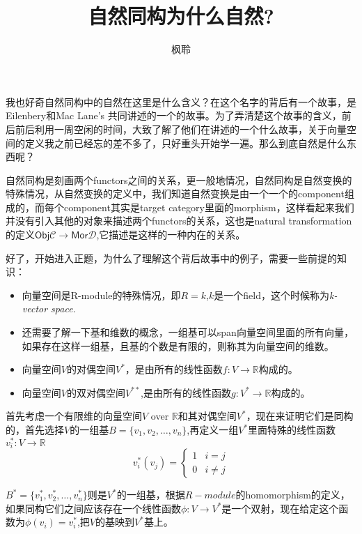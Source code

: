 \documentclass[UTF8,11pt,a4paper]{ctexart}%
\begin{document}
\newcommand*{\xfunc}[4]{{#2}\colon{#3}{#1}{#4}}
\newcommand*{\func}[3]{\xfunc{\to}{#1}{#2}{#3}}
 
\title{自然同构为什么自然?}
\author{枫聆}
\maketitle

我也好奇自然同构中的自然在这里是什么含义？在这个名字的背后有一个故事，是Eilenbery和Mac Lane's 共同讲述的一个的故事。为了弄清楚这个故事的含义，前后前后利用一周空闲的时间，大致了解了他们在讲述的一个什么故事，关于向量空间的定义我之前已经忘的差不多了，只好重头开始学一遍。那么到底自然是什么东西呢？

自然同构是刻画两个functors之间的关系，更一般地情况，自然同构是自然变换的特殊情况，从自然变换的定义中，我们知道自然变换是由一个一个的component组成的，而每个component其实是target category里面的morphism，这样看起来我们并没有引入其他的对象来描述两个functors的关系，这也是natural transformation的定义$\textsf{Obj}\mathcal{C} \rightarrow \textsf{Mor}\mathcal{D}$,它描述是这样的一种内在的关系。

好了，开始进入正题，为什么了理解这个背后故事中的例子，需要一些前提的知识：

\begin{itemize}
	\item 向量空间是R-module的特殊情况，即$R=k$,$k$是一个field，这个时候称为\textsl{k-vector space}.
	\item 还需要了解一下基和维数的概念，一组基可以span向量空间里面的所有向量，如果存在这样一组基，且基的个数是有限的，则称其为向量空间的维数。
	\item 向量空间$V$的对偶空间$V^{*}$，是由所有的线性函数$\func{f}{V}{\mathbb{R}}$构成的。
	\item 向量空间$V$的双对偶空间$V^{**}$,是由所有的线性函数$\func{g}{V^{*}}{\mathbb{R}}$构成的。
	
\end{itemize}

首先考虑一个有限维的向量空间$V$ over $\mathbb{R}$和其对偶空间$V^{*}$，现在来证明它们是同构的，首先选择$V$的一组基$B=\{v_1,v_2,\ldots,v_n\}$,再定义一组$V^{*}$里面特殊的线性函数$\func{v_i^{*}}{V}{\mathbb{R}}$ 
	\[v_i^{*}(v_j)=\left\{ 
	\begin{array}{rcl}
	1 & i=j \\
	0 & i\neq j
	\end{array}
	\right.
	\]
	
$B^{*}=\{v_1^{*},v_2^{*},\ldots,v_n^{*}\}$则是$V^{*}$的一组基，根据$R-module$的homomorphism的定义，如果同构它们之间应该存在一个线性函数$\func{\phi}{V}{V^{*}}$是一个双射，现在给定这个函数为$\phi(v_i)=v_i^{*}$,把$V$的基映到$V^{*}$基上。
\end{document}
